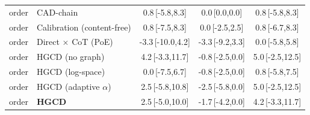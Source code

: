 \begin{tabular}{llccc}
order & CAD-chain & 0.8\,{\scriptsize[-5.8,8.3]} & 0.0\,{\scriptsize[0.0,0.0]} & 0.8\,{\scriptsize[-5.8,8.3]} \\
order & Calibration (content-free) & 0.8\,{\scriptsize[-7.5,8.3]} & 0.0\,{\scriptsize[-2.5,2.5]} & 0.8\,{\scriptsize[-6.7,8.3]} \\
order & Direct $\times$ CoT (PoE) & -3.3\,{\scriptsize[-10.0,4.2]} & -3.3\,{\scriptsize[-9.2,3.3]} & 0.0\,{\scriptsize[-5.8,5.8]} \\
order & HGCD (no graph) & 4.2\,{\scriptsize[-3.3,11.7]} & -0.8\,{\scriptsize[-2.5,0.0]} & 5.0\,{\scriptsize[-2.5,12.5]} \\
order & HGCD (log-space) & 0.0\,{\scriptsize[-7.5,6.7]} & -0.8\,{\scriptsize[-2.5,0.0]} & 0.8\,{\scriptsize[-5.8,7.5]} \\
order & HGCD (adaptive $\alpha$) & 2.5\,{\scriptsize[-5.8,10.8]} & -2.5\,{\scriptsize[-5.8,0.0]} & 5.0\,{\scriptsize[-2.5,12.5]} \\
order & \textbf{HGCD} & 2.5\,{\scriptsize[-5.0,10.0]} & -1.7\,{\scriptsize[-4.2,0.0]} & 4.2\,{\scriptsize[-3.3,11.7]} \\
\bottomrule
\end{tabular}
